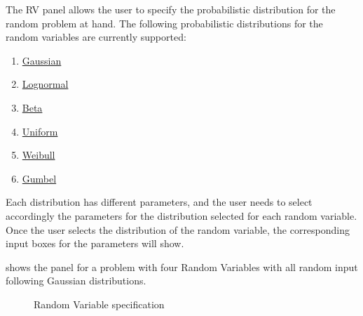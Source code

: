 The RV panel allows the user to specify the probabilistic distribution for the random problem at hand. The following probabilistic distributions for the random variables are currently supported: 

\begin{enumerate}
\item \href{https://dakota.sandia.gov//sites/default/files/docs/6.9/html-ref/variables-normal_uncertain.html}{Gaussian}
\item \href{https://dakota.sandia.gov//sites/default/files/docs/6.9/html-ref/variables-lognormal_uncertain.html}{Lognormal}
\item \href{https://dakota.sandia.gov//sites/default/files/docs/6.9/html-ref/variables-beta_uncertain.html}{Beta}
\item \href{https://dakota.sandia.gov//sites/default/files/docs/6.9/html-ref/variables-uniform_uncertain.html}{Uniform}
\item \href{https://dakota.sandia.gov//sites/default/files/docs/6.9/html-ref/variables-weibull_uncertain.html}{Weibull}
\item \href{https://dakota.sandia.gov//sites/default/files/docs/6.9/html-ref/variables-gumbel_uncertain.html}{Gumbel}
\end{enumerate} 


Each distribution has different parameters, and the user needs to select accordingly the parameters for the distribution selected for each random variable. Once the user selects the distribution of the random variable, the
corresponding input boxes for the parameters will show. 

 shows the panel for a problem with four Random Variables with all random input following Gaussian distributions. 

\begin{figure}[!htbp]
  \caption{Random Variable specification}
  \label{fig:rv}
\end{figure}


